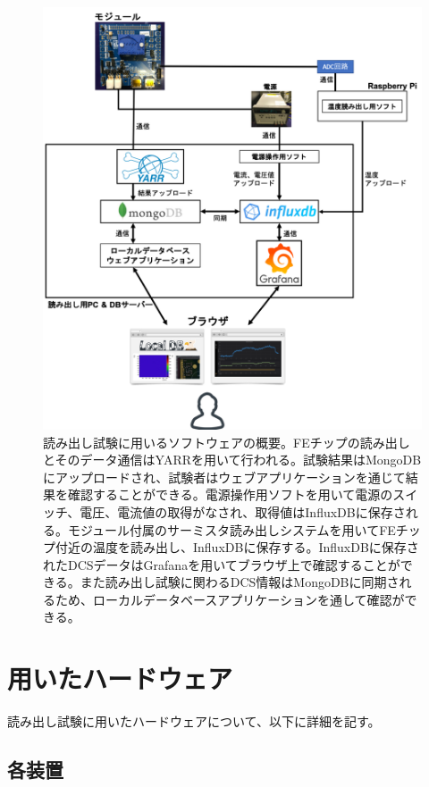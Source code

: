 \begin{figure}[bpt]\centering
\includegraphics[width=14cm]{./readout_SW_overview.png}
\caption[読み出し試験に用いるソフトウェアの概要]{読み出し試験に用いるソフトウェアの概要。FEチップの読み出しとそのデータ通信はYARRを用いて行われる。試験結果はMongoDBにアップロードされ、試験者はウェブアプリケーションを通じて結果を確認することができる。電源操作用ソフトを用いて電源のスイッチ、電圧、電流値の取得がなされ、取得値はInfluxDBに保存される。モジュール付属のサーミスタ読み出しシステムを用いてFEチップ付近の温度を読み出し、InfluxDBに保存する。InfluxDBに保存されたDCSデータはGrafanaを用いてブラウザ上で確認することができる。また読み出し試験に関わるDCS情報はMongoDBに同期されるため、ローカルデータベースアプリケーションを通して確認ができる。}
\label{readout_SW_overview}
\end{figure}

\clearpage
\section{用いたハードウェア}
読み出し試験に用いたハードウェアについて、以下に詳細を記す。

\subsection{各装置}

